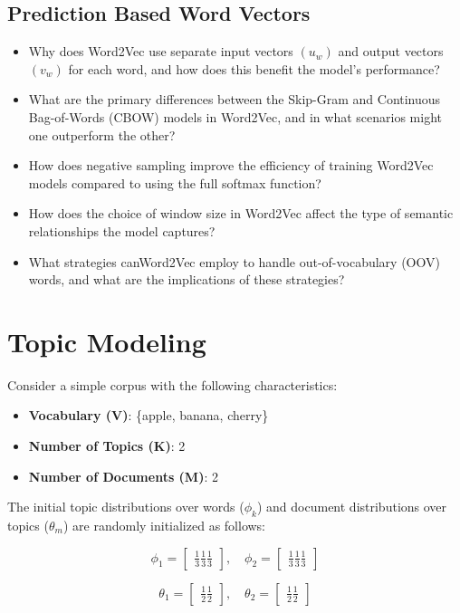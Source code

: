\documentclass{article}
\begin{document}
	\subsection { Prediction Based Word Vectors }

	\begin{itemize}
		\item Why does Word2Vec use separate input vectors $(u_w)$ and output vectors
$(v_w)$ for each word, and how does this benefit the model’s performance?
		\item What are the primary differences between the Skip-Gram and Continuous
Bag-of-Words (CBOW) models in Word2Vec, and in what scenarios might
one outperform the other?
		\item How does negative sampling improve the efficiency of training Word2Vec
models compared to using the full softmax function?
		\item How does the choice of window size in Word2Vec affect the type of semantic
relationships the model captures?
		\item What strategies canWord2Vec employ to handle out-of-vocabulary (OOV)
words, and what are the implications of these strategies?
	\end{itemize}

\newpage
\section { Topic Modeling }
Consider a simple corpus with the following characteristics:

\begin{itemize}
    \item \textbf{Vocabulary (V)}: \{apple, banana, cherry\}
    \item \textbf{Number of Topics (K)}: 2
    \item \textbf{Number of Documents (M)}: 2
\end{itemize}

The initial topic distributions over words ($\phi_k$) and document distributions over topics ($\theta_m$) are randomly initialized as follows:

\[
\phi_1 =
\begin{bmatrix}
\frac{1}{3} \frac{1}{3} \frac{1}{3}
\end{bmatrix}, \quad
\phi_2 =
\begin{bmatrix}
\frac{1}{3} \frac{1}{3} \frac{1}{3}
\end{bmatrix}
\]

\[
\theta_1 =
\begin{bmatrix}
\frac{1}{2}  \frac{1}{2}
\end{bmatrix}, \quad
\theta_2 =
\begin{bmatrix}
\frac{1}{2} \frac{1}{2}
\end{bmatrix}
\]
\end{document}
